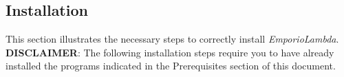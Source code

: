 \subsection{Installation}
This section illustrates the necessary steps to correctly install \textit{EmporioLambda}.\\
\textbf{DISCLAIMER}: The following installation steps require you to have already installed the programs indicated in the Prerequisites section of this document.



